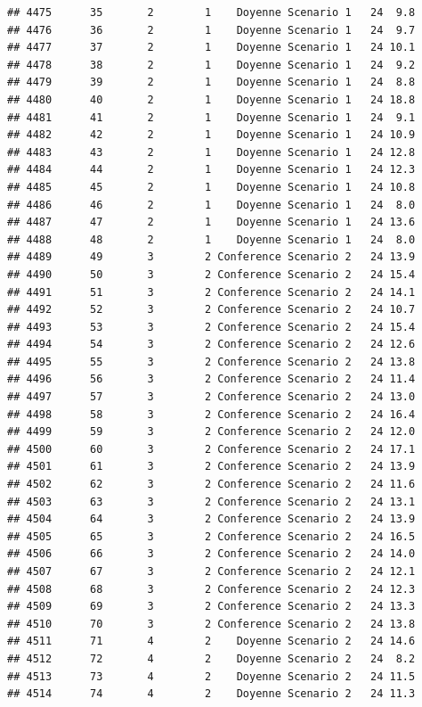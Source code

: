 \documentclass[
]{article}
\begin{document}
\begin{verbatim}
## 4475      35       2        1    Doyenne Scenario 1   24  9.8
## 4476      36       2        1    Doyenne Scenario 1   24  9.7
## 4477      37       2        1    Doyenne Scenario 1   24 10.1
## 4478      38       2        1    Doyenne Scenario 1   24  9.2
## 4479      39       2        1    Doyenne Scenario 1   24  8.8
## 4480      40       2        1    Doyenne Scenario 1   24 18.8
## 4481      41       2        1    Doyenne Scenario 1   24  9.1
## 4482      42       2        1    Doyenne Scenario 1   24 10.9
## 4483      43       2        1    Doyenne Scenario 1   24 12.8
## 4484      44       2        1    Doyenne Scenario 1   24 12.3
## 4485      45       2        1    Doyenne Scenario 1   24 10.8
## 4486      46       2        1    Doyenne Scenario 1   24  8.0
## 4487      47       2        1    Doyenne Scenario 1   24 13.6
## 4488      48       2        1    Doyenne Scenario 1   24  8.0
## 4489      49       3        2 Conference Scenario 2   24 13.9
## 4490      50       3        2 Conference Scenario 2   24 15.4
## 4491      51       3        2 Conference Scenario 2   24 14.1
## 4492      52       3        2 Conference Scenario 2   24 10.7
## 4493      53       3        2 Conference Scenario 2   24 15.4
## 4494      54       3        2 Conference Scenario 2   24 12.6
## 4495      55       3        2 Conference Scenario 2   24 13.8
## 4496      56       3        2 Conference Scenario 2   24 11.4
## 4497      57       3        2 Conference Scenario 2   24 13.0
## 4498      58       3        2 Conference Scenario 2   24 16.4
## 4499      59       3        2 Conference Scenario 2   24 12.0
## 4500      60       3        2 Conference Scenario 2   24 17.1
## 4501      61       3        2 Conference Scenario 2   24 13.9
## 4502      62       3        2 Conference Scenario 2   24 11.6
## 4503      63       3        2 Conference Scenario 2   24 13.1
## 4504      64       3        2 Conference Scenario 2   24 13.9
## 4505      65       3        2 Conference Scenario 2   24 16.5
## 4506      66       3        2 Conference Scenario 2   24 14.0
## 4507      67       3        2 Conference Scenario 2   24 12.1
## 4508      68       3        2 Conference Scenario 2   24 12.3
## 4509      69       3        2 Conference Scenario 2   24 13.3
## 4510      70       3        2 Conference Scenario 2   24 13.8
## 4511      71       4        2    Doyenne Scenario 2   24 14.6
## 4512      72       4        2    Doyenne Scenario 2   24  8.2
## 4513      73       4        2    Doyenne Scenario 2   24 11.5
## 4514      74       4        2    Doyenne Scenario 2   24 11.3

\end{verbatim}
\end{document}
